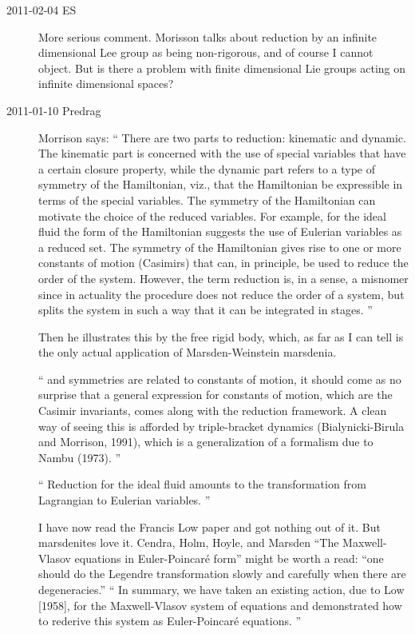 \begin{description}
\item[2011-02-04 ES] More serious comment. Morisson talks about
reduction by an infinite dimensional Lee group as being non-rigorous,
and of course I cannot object. But is there a
problem with finite dimensional Lie groups acting on infinite dimensional
spaces?

\item[2011-01-10 Predrag]
Morrison says:
``
There are two parts to reduction: kinematic and dynamic. The kinematic
part is concerned with the use of special variables that have a certain
closure property, while the dynamic part refers to a type of symmetry of
the Hamiltonian, viz., that the Hamiltonian be expressible in terms of
the special variables. The symmetry of the Hamiltonian can motivate the
choice of the reduced variables. For example, for the ideal fluid the
form of the Hamiltonian suggests the use of Eulerian variables as a
reduced set.
The symmetry of the Hamiltonian gives rise to one or more constants of
motion (Casimirs) that can, in principle, be used to reduce the order of
the system. However, the term reduction is, in a sense, a misnomer since
in actuality the procedure does not reduce the order of a system, but
splits the system in such a way that it can be integrated in stages.
''

Then he illustrates this by the free rigid body, which, as far as I can
tell is the only actual application of Marsden-Weinstein marsdenia.

``
and symmetries are related to constants of motion, it should come as no
surprise that a general expression for constants of motion, which are the
Casimir invariants, comes along with the reduction framework. A clean way
of seeing this is afforded by triple-bracket dynamics (Bialynicki-Birula
and Morrison, 1991), which is a generalization of a formalism due to
Nambu (1973).
''

``
Reduction for the ideal fluid amounts to the transformation from
Lagrangian to Eulerian variables.
''

I have now read the  Francis Low paper and got nothing out of
it. But marsdenites love it. Cendra, Holm, Hoyle, and Marsden
``The {Maxwell-Vlasov} equations in {Euler-Poincar\'e} form'' might be
worth a read:
``one should do the Legendre transformation slowly and
carefully when there are degeneracies.''
``
In summary, we have taken an existing action, due to Low [1958], for the
Maxwell-Vlasov system of equations and demonstrated how to rederive this system
as Euler-Poincar\'e equations.
''


\end{description}
